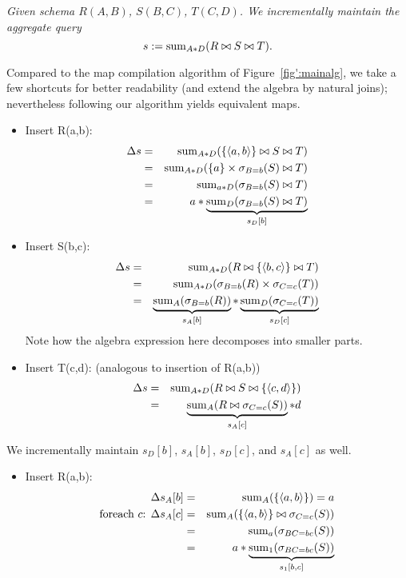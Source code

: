 \begin{example}\em
Given schema $R(A,B)$, $S(B,C)$, $T(C,D)$.
We incrementally maintain the aggregate query
\[
s := \mathrm{sum}_{A*D}(R \bowtie S \bowtie T).
\]

Compared to the map compilation algorithm of Figure~\ref{fig':mainalg}, we take a
few shortcuts for better readability (and extend the algebra by natural joins);
nevertheless following our algorithm yields equivalent maps. 
\begin{itemize}
\item
Insert R(a,b):
\begin{eqnarray*}
\Delta s &=& \mathrm{sum}_{A*D}(\{{\langle a,b\rangle}\} \bowtie S \bowtie T)
\\ &=&
\mathrm{sum}_{A*D}(\{a\} \times \sigma_{B=b}(S) \bowtie T)
\\ &=&
\mathrm{sum}_{a*D}(\sigma_{B=b}(S) \bowtie T)
\\ &=&
a * \underbrace{\mathrm{sum}_{D}(\sigma_{B=b}(S) \bowtie T)}_{s_D[b]}
\end{eqnarray*}

\item
Insert S(b,c):
\begin{eqnarray*}
\Delta s &=& \mathrm{sum}_{A*D}(R \bowtie \{{\langle b,c\rangle}\} \bowtie T)
\\ &=&
\mathrm{sum}_{A*D}(\sigma_{B=b}(R) \times \sigma_{C=c}(T))
\\ &=&
\underbrace{\mathrm{sum}_{A}(\sigma_{B=b}(R))}_{s_A[b]} *
\underbrace{\mathrm{sum}_{D}(\sigma_{C=c}(T))}_{s_D[c]}
\end{eqnarray*}
%
Note how the algebra expression here decomposes into smaller parts.

\item
Insert T(c,d): (analogous to insertion of R(a,b))
\begin{eqnarray*}
\Delta s &=& \mathrm{sum}_{A*D}(R \bowtie S \bowtie \{{\langle c,d\rangle}\})
\\ &=&
\underbrace{\mathrm{sum}_{A}(R \bowtie \sigma_{C=c}(S))}_{s_A[c]} * d
\end{eqnarray*}
\end{itemize}

We incrementally maintain $s_D[b]$, $s_A[b]$, $s_D[c]$, and
$s_A[c]$ as well.

\begin{itemize}
\item
Insert R(a,b):
\begin{eqnarray*}
\Delta s_A[b] &=& \mathrm{sum}_{A}(\{{\langle a,b\rangle}\}) = a
\\
\mbox{foreach $c$: }
\Delta s_A[c] &=& \mathrm{sum}_{A}(\{{\langle a,b\rangle}\} \bowtie \sigma_{C=c}(S))
\\ &=&
\mathrm{sum}_{a}(\sigma_{BC=bc}(S))
\\ &=&
a * \underbrace{\mathrm{sum}_{1}(\sigma_{BC=bc}(S))}_{s_1[b,c]}
\end{eqnarray*}


\end{itemize}
\end{example}
